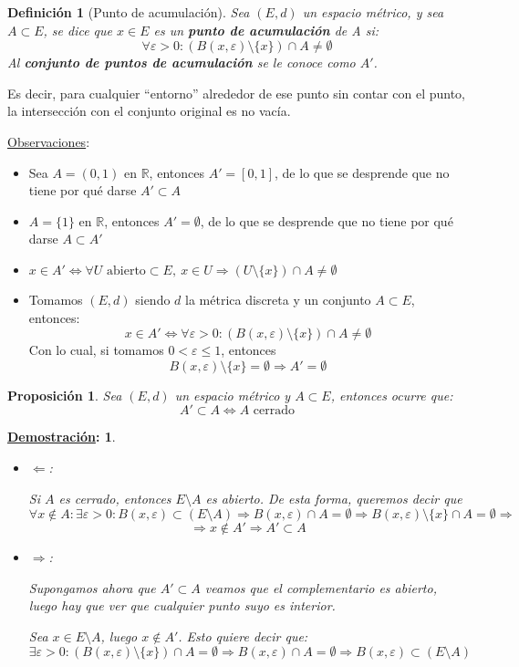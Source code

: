 \documentclass[10pt,a4paper,openright]{book}
\theoremstyle{break}
\newtheorem*{defi}{Definición}
\newtheorem*{prop}{Proposición}
\newtheorem*{demo}{\underline{Demostración}:}
\begin{document}
\newpage

\begin{defi}[Punto de acumulación]
Sea $(E,d)$ un espacio métrico, y sea $A \subset E$, se dice que $x \in E$ es un \textbf{punto de acumulación} de A si:
$$\forall \varepsilon > 0: \left(B(x,\varepsilon)\setminus\{x\}\right)\cap A \neq \emptyset$$
 Al \textbf{conjunto de puntos de acumulación} se le conoce como $A'$.
\end{defi}
Es decir, para cualquier ``entorno'' alrededor de ese punto sin contar con el punto, la intersección con el conjunto original es no vacía.

\underline{Observaciones}:
\begin{itemize}
\item Sea $A=(0,1)$ en $\mathbb{R}$, entonces $A'=[0,1]$, de lo que se desprende que no tiene por qué darse $A'\subset A$
\item $A = \{1\}$ en $\mathbb{R}$, entonces $A' = \emptyset$, de lo que se desprende que no tiene por qué darse $A\subset A'$
\item $x\in A' \Leftrightarrow \forall U \mbox{ abierto} \subset E, \ x\in U \Rightarrow \left( U\setminus\{x\}\right) \cap A \neq \emptyset$
\item Tomamos $(E,d)$ siendo $d$ la métrica discreta y un conjunto $A\subset E$, entonces:
$$x\in A' \Leftrightarrow \forall \varepsilon > 0: \left( B(x,\varepsilon) \setminus\{x\}\right) \cap A \neq \emptyset$$
Con lo cual, si tomamos $0 < \varepsilon \leq 1$, entonces
$$B(x,\varepsilon)\setminus\{x\} =\emptyset \Rightarrow A' = \emptyset$$
\end{itemize}

\begin{prop}
Sea $(E,d)$ un espacio métrico y $A\subset E$, entonces ocurre que:
$$A'\subset A \Leftrightarrow A \mbox{ cerrado}$$
\end{prop}
\begin{demo}
\begin{itemize}
\item $\Leftarrow$:

Si $A$ es cerrado, entonces $E\setminus A$ es abierto. De esta forma, queremos decir que
$$\forall x \notin A : \exists \varepsilon > 0 : B(x,\varepsilon)\subset (E\setminus A) \Rightarrow B(x,\varepsilon) \cap A = \emptyset \Rightarrow B(x,\varepsilon)\setminus \{x\} \cap A = \emptyset \Rightarrow$$
$$\Rightarrow x \notin A' \Rightarrow A' \subset A$$

\item $\Rightarrow$:

Supongamos ahora que $A'\subset A$ veamos que el complementario es abierto, luego hay que ver que cualquier punto suyo es interior.

Sea $x\in E\setminus A$, luego $x\notin A'$. Esto quiere decir que:
$$\exists \varepsilon > 0 : \left(B(x,\varepsilon)\setminus\{x\}\right)\cap A = \emptyset \Rightarrow B(x,\varepsilon)\cap A = \emptyset \Rightarrow B(x,\varepsilon)\subset (E\setminus A)$$
\end{itemize}
\end{demo}
\end{document}
